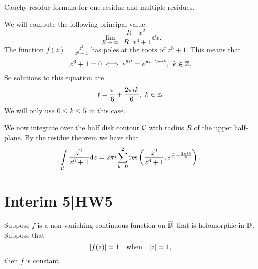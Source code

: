 \documentclass[12pt]{memoir}
\begin{document}
Cauchy residue formula for one residue and multiple residues.

\begin{Ex}
    We will compute the following principal value:
    $$\lim_{R\to\infty}\frac{-R}{R}\frac{x^2}{x^6+1}\dd x.$$
    The function $f(z)=\frac{z^2}{z^6+1}$ has poles at the roots of $z^6+1$. This means that 
    $$z^6+1=0\iff e^{6it}=e^{\pi i+2\pi ik},\ k\in\mathbb{Z}.$$
    So solutions to this equation are 
    $$t=\frac{\pi}{6}+\frac{2\pi ik}{6},\ k\in\bZ.$$
    We will only use $0\leq k\leq 5$ in this case.\par
    We now integrate over the half disk contour $\mathcal{C}$ with radius $R$ of the upper half-plane. By the residue theorem we have that 
    $$\int\limits_{\mathcal{C}}\frac{z^2}{z^6+1}\dd z=2\pi i\sum_{k=0}^{2}\operatorname*{res}\left(\frac{z^2}{z^6+1},e^{\frac{\pi}{6}+\frac{2\pi ik}{6}}\right).$$ 
\end{Ex}


\section{Interim 5|HW5}

\begin{Ej}
    Suppose $f$ is a non-vanishing continuous function on $\overline{\mathbb{D}}$ that is holomorphic in $\mathbb{D}$. Suppose that 
    $$|f(z)|=1\quad\text{when}\quad|z|=1,$$
    then $f$ is constant. 
\end{Ej}
\end{document}
